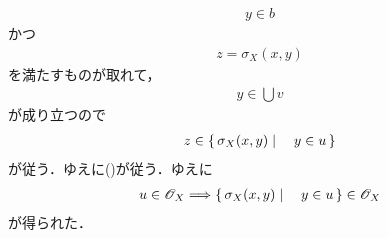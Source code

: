 \begin{sketch}
\begin{description}
\begin{align}
					y \in b
				\end{align}
				かつ
				\begin{align}
					z = \sigma_X(x,y)
				\end{align}
				を満たすものが取れて，
				\begin{align}
					y \in \bigcup v
				\end{align}
				が成り立つので
				\begin{align}
					z \in \left\{\, \sigma_X(x,y) \mid \quad y \in u\, \right\}
				\end{align}
				が従う．ゆえに()が従う．ゆえに
				\begin{align}
					u \in \mathscr{O}_X \Longrightarrow \left\{\, \sigma_X(x,y) \mid \quad y \in u\, \right\} \in \mathscr{O}_X
				\end{align}
				が得られた．
				

\end{description}
\end{sketch}
